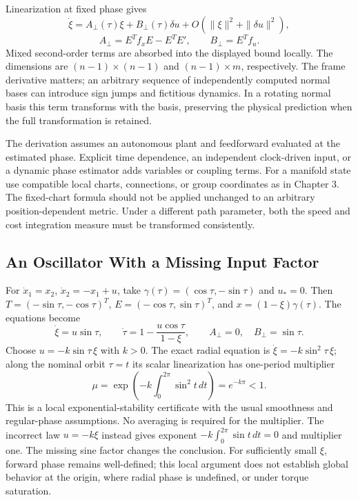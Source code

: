 \documentclass[12pt, openany]{book}
\theoremstyle{plain}
\begin{document}
Linearization at fixed phase gives
\begin{equation}\label{eq:transverse_linear}
 \dot\xi=A_\perp(\tau)\xi+B_\perp(\tau)\delta u
       +O(\|\xi\|^2+\|\delta u\|^2),
\end{equation}
\begin{equation}\label{eq:transverse_practical}
 A_\perp=E^Tf_xE-E^TE',\qquad B_\perp=E^Tf_u.
\end{equation}
Mixed second-order terms are absorbed into the displayed bound locally.
The dimensions are $(n-1)\times(n-1)$ and $(n-1)\times m$, respectively.
The frame derivative matters; an arbitrary sequence of independently computed
normal bases can introduce sign jumps and fictitious dynamics. In a rotating
normal basis this term transforms with the basis, preserving the physical
prediction when the full transformation is retained.

The derivation assumes an autonomous plant and feedforward evaluated at the
estimated phase. Explicit time dependence, an independent clock-driven input,
or a dynamic phase estimator adds variables or coupling terms. For a manifold
state use compatible local charts, connections, or group coordinates as in
Chapter 3. The fixed-chart formula should not be applied unchanged to an
arbitrary position-dependent metric. Under a different path parameter, both
the speed and cost integration measure must be transformed consistently.

\subsection{An Oscillator With a Missing Input Factor}

For $\dot x_1=x_2$, $\dot x_2=-x_1+u$, take
$\gamma(\tau)=(\cos\tau,-\sin\tau)$ and $u_*=0$. Then
$T=(-\sin\tau,-\cos\tau)^T$, $E=(-\cos\tau,\sin\tau)^T$, and
$x=(1-\xi)\gamma(\tau)$. The equations become
\begin{equation}\label{eq:orbital_oscillator}
 \dot\xi=u\sin\tau,\qquad
 \dot\tau=1-\frac{u\cos\tau}{1-\xi},\qquad
 A_\perp=0,\quad B_\perp=\sin\tau.
\end{equation}
Choose $u=-k\sin\tau\,\xi$ with $k>0$. The exact radial equation is
$\dot\xi=-k\sin^2\tau\,\xi$; along the nominal orbit $\tau=t$ its scalar
linearization has one-period multiplier
\begin{equation}\label{eq:orbital_oscillator_multiplier}
 \mu=\exp\!\left(-k\int_0^{2\pi}\sin^2t\,dt\right)=e^{-k\pi}<1.
\end{equation}
This is a local exponential-stability certificate with the usual smoothness
and regular-phase assumptions. No averaging is required for the multiplier.
The incorrect law $u=-k\xi$ instead gives exponent
$-k\int_0^{2\pi}\sin t\,dt=0$ and multiplier one. The missing sine factor
changes the conclusion. For sufficiently small $\xi$, forward phase remains
well-defined; this local argument does not establish global behavior at the
origin, where radial phase is undefined, or under torque saturation.
\end{document}
